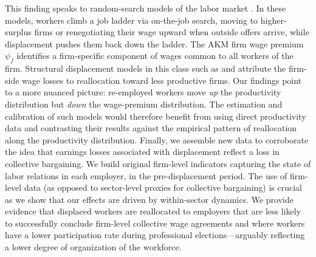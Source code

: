 This finding speaks to random-search models of the labor market \citep{Lentz2024}. In these models, workers climb a job ladder via on-the-job search, moving to higher-surplus firms or renegotiating their wage upward when outside offers arrive, while displacement pushes them back down the ladder. The AKM firm wage premium $\psi_f$ identifies a firm-specific component of wages common to all workers of the firm. Structural displacement models in this class such as \citet{krolikowski2017job} and \citet{Audoly_2024} attribute the firm-side wage losses to reallocation toward less productive firms. Our findings point to a more nuanced picture: re-employed workers move \emph{up} the productivity distribution but \emph{down} the wage-premium distribution. The estimation and calibration of such models would therefore benefit from using direct productivity data and contrasting their results against the empirical pattern of reallocation along the productivity distribution. Finally, we assemble new data to corroborate the idea that earnings losses associated with displacement reflect a loss in collective bargaining. We build original firm-level indicators capturing the state of labor relations in each employer, in the pre-displacement period. The use of firm-level data (as opposed to sector-level proxies for collective bargaining) is crucial as we show that our effects are driven by within-sector dynamics. We provide evidence that displaced workers are reallocated to employers that are less likely to successfully conclude firm-level collective wage agreements and where workers have a lower participation rate during professional elections---arguably reflecting a lower degree of organization of the workforce.




